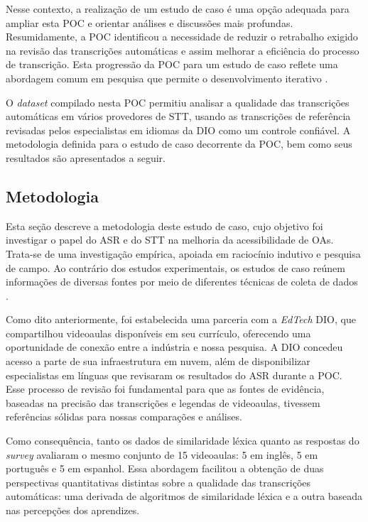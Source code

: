 Nesse contexto, a realização de um estudo de caso é uma opção adequada para ampliar esta POC e orientar análises e discussões mais profundas. Resumidamente, a POC identificou a necessidade de reduzir o retrabalho exigido na revisão das transcrições automáticas e assim melhorar a eficiência do processo de transcrição. Esta progressão da POC para um estudo de caso reflete uma abordagem comum em pesquisa que permite o desenvolvimento iterativo \cite{Runeson2009}. 

O \textit{dataset} compilado nesta POC permitiu analisar a qualidade das transcrições automáticas em vários provedores de STT, usando as transcrições de referência revisadas pelos especialistas em idiomas da DIO como um controle confiável. A metodologia definida para o estudo de caso decorrente da POC, bem como seus resultados são apresentados a seguir.

\subsection{Metodologia}

Esta seção descreve a metodologia deste estudo de caso, cujo objetivo foi investigar o papel do ASR e do STT na melhoria da acessibilidade de OAs. Trata-se de uma investigação empírica, apoiada em raciocínio indutivo e pesquisa de campo. Ao contrário dos estudos experimentais, os estudos de caso reúnem informações de diversas fontes por meio de diferentes técnicas de coleta de dados \cite{Sommerville2015}.

Como dito anteriormente, foi estabelecida uma parceria com a \textit{EdTech} DIO, que compartilhou videoaulas disponíveis em seu currículo, oferecendo uma oportunidade de conexão entre a indústria e nossa pesquisa. A DIO concedeu acesso a parte de sua infraestrutura em nuvem, além de disponibilizar especialistas em línguas que revisaram os resultados do ASR durante a POC. Esse processo de revisão foi fundamental para que as fontes de evidência, baseadas na precisão das transcrições e legendas de videoaulas, tivessem referências sólidas para nossas comparações e análises.

Como consequência, tanto os dados de similaridade léxica quanto as respostas do \textit{survey} avaliaram o mesmo conjunto de 15 videoaulas: 5 em inglês, 5 em português e 5 em espanhol. Essa abordagem facilitou a obtenção de duas perspectivas quantitativas distintas sobre a qualidade das transcrições automáticas: uma derivada de algoritmos de similaridade léxica e a outra baseada nas percepções dos aprendizes.

